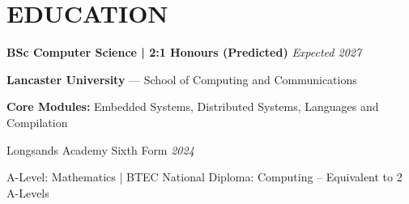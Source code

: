 \section{EDUCATION}

\noindent\textbf{BSc Computer Science | 2:1 Honours (Predicted)} \hfill \textit{Expected 2027} \par
\quad \textbf{Lancaster University} --- School of Computing and Communications \par
\quad \textbf{Core Modules:} Embedded Systems, Distributed Systems, Languages and Compilation

\vspace{6pt}
\noindent Longsands Academy Sixth Form \hfill \textit{2024} \par
\quad \small A-Level: Mathematics | BTEC National Diploma: Computing -- Equivalent to 2 A-Levels